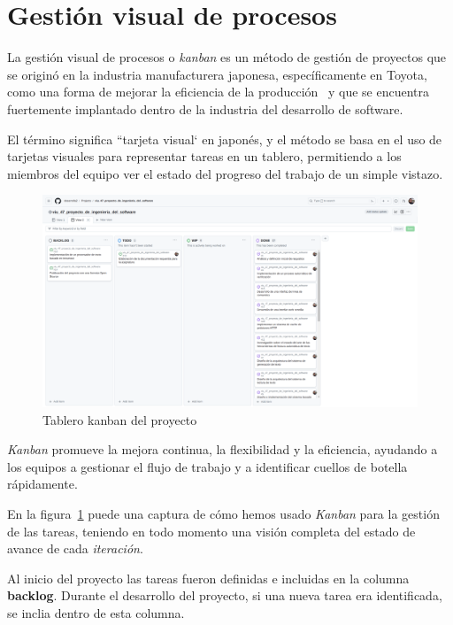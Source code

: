 \section{Gestión visual de procesos}

La gestión visual de procesos o \textit{kanban} es un método de gestión de proyectos que se originó en la industria
manufacturera japonesa, específicamente en Toyota, como una forma de mejorar la eficiencia de la
producción~\cite{book_anderson_2010} y que se encuentra fuertemente implantado dentro de la industria del desarrollo
de software.

El término significa ``tarjeta visual` en japonés, y el método se basa en el uso de tarjetas visuales para
representar tareas en un tablero, permitiendo a los miembros del equipo ver el estado del progreso del trabajo de un
simple vistazo.

\begin{figure}[ht]
    \begin{center}
        \includegraphics[width=\textwidth]{./chapter/3/images/chapter_3.kanban}
        \caption{Tablero kanban del proyecto}
        \label{fig:chapter_3.kanban}
    \end{center}
\end{figure}

\textit{Kanban} promueve la mejora continua, la flexibilidad y la eficiencia, ayudando a los equipos a gestionar el
flujo de trabajo y a identificar cuellos de botella rápidamente.

En la figura~\ref{fig:chapter_3.kanban} puede una captura de cómo hemos usado \textit{Kanban} para la gestión de las
tareas, teniendo en todo momento una visión completa del estado de avance de cada \textit{iteración}.

Al inicio del proyecto las tareas fueron definidas e incluidas en la columna \textbf{backlog}.
Durante el desarrollo del proyecto, si una nueva tarea era identificada, se inclia dentro de esta columna.

